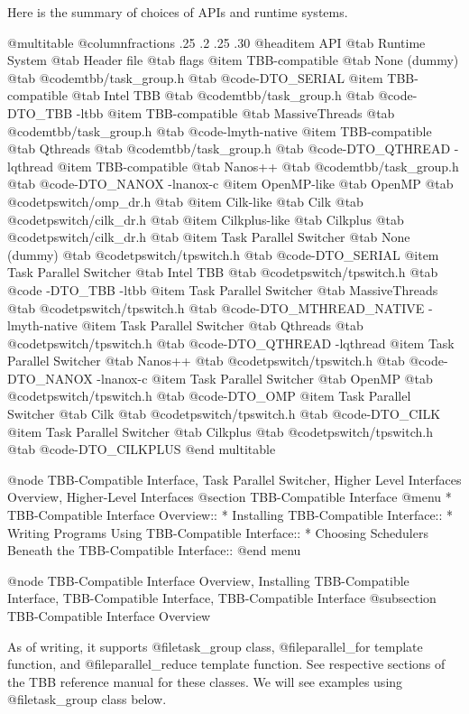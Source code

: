 Here is the summary of choices of APIs and runtime systems.

@multitable @columnfractions .25 .2 .25 .30
@headitem API            @tab Runtime System  @tab Header file      @tab flags
@item     TBB-compatible @tab None (dummy)   @tab @code{mtbb/task_group.h} @tab @code{-DTO_SERIAL}
@item     TBB-compatible @tab Intel TBB      @tab @code{mtbb/task_group.h} @tab @code{-DTO_TBB -ltbb}
@item     TBB-compatible @tab MassiveThreads @tab @code{mtbb/task_group.h} @tab @code{-lmyth-native}
@item     TBB-compatible @tab Qthreads       @tab @code{mtbb/task_group.h} @tab @code{-DTO_QTHREAD -lqthread}
@item     TBB-compatible @tab Nanos++        @tab @code{mtbb/task_group.h} @tab @code{-DTO_NANOX -lnanox-c}
@item     OpenMP-like    @tab OpenMP @tab @code{tpswitch/omp_dr.h}          @tab
@item     Cilk-like      @tab Cilk   @tab @code{tpswitch/cilk_dr.h}         @tab
@item     Cilkplus-like  @tab Cilkplus   @tab @code{tpswitch/cilk_dr.h}         @tab
@item     Task Parallel Switcher @tab None (dummy) @tab @code{tpswitch/tpswitch.h} @tab @code{-DTO_SERIAL}
@item     Task Parallel Switcher @tab Intel TBB @tab @code{tpswitch/tpswitch.h} @tab @code{ -DTO_TBB -ltbb}
@item     Task Parallel Switcher @tab MassiveThreads @tab @code{tpswitch/tpswitch.h} @tab @code{-DTO_MTHREAD_NATIVE -lmyth-native}
@item     Task Parallel Switcher @tab Qthreads @tab @code{tpswitch/tpswitch.h} @tab @code{-DTO_QTHREAD -lqthread}
@item     Task Parallel Switcher @tab Nanos++ @tab @code{tpswitch/tpswitch.h} @tab @code{-DTO_NANOX -lnanox-c}
@item     Task Parallel Switcher @tab OpenMP @tab @code{tpswitch/tpswitch.h} @tab @code{-DTO_OMP}
@item     Task Parallel Switcher @tab Cilk @tab @code{tpswitch/tpswitch.h} @tab @code{-DTO_CILK}
@item     Task Parallel Switcher @tab Cilkplus @tab @code{tpswitch/tpswitch.h} @tab @code{-DTO_CILKPLUS}
@end multitable

@node TBB-Compatible Interface, Task Parallel Switcher, Higher Level Interfaces Overview, Higher-Level Interfaces
@section TBB-Compatible Interface
@menu
* TBB-Compatible Interface Overview::
* Installing TBB-Compatible Interface::
* Writing Programs Using TBB-Compatible Interface::
* Choosing Schedulers Beneath the TBB-Compatible Interface::
@end menu

@node TBB-Compatible Interface Overview, Installing TBB-Compatible Interface, TBB-Compatible Interface, TBB-Compatible Interface
@subsection TBB-Compatible Interface Overview

As of writing, it supports @file{task_group} class, @file{parallel_for}
template function, and @file{parallel_reduce} template function.  See
respective sections of the TBB reference manual for these classes.
We will see examples using @file{task_group} class below.

